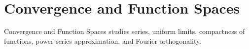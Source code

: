 \section{Convergence and Function Spaces}

Convergence and Function Spaces studies series, uniform limits, compactness of functions, power-series approximation, and Fourier orthogonality.











